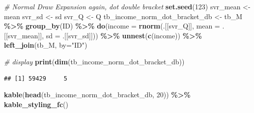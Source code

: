 \documentclass[
]{book}
\newenvironment{Shaded}{\begin{snugshade}}{\end{snugshade}}
\newcommand{\CommentTok}[1]{\textcolor[rgb]{0.56,0.35,0.01}{\textit{#1}}}
\newcommand{\DataTypeTok}[1]{\textcolor[rgb]{0.13,0.29,0.53}{#1}}
\newcommand{\DecValTok}[1]{\textcolor[rgb]{0.00,0.00,0.81}{#1}}
\newcommand{\KeywordTok}[1]{\textcolor[rgb]{0.13,0.29,0.53}{\textbf{#1}}}
\newcommand{\NormalTok}[1]{#1}
\newcommand{\OperatorTok}[1]{\textcolor[rgb]{0.81,0.36,0.00}{\textbf{#1}}}
\newcommand{\StringTok}[1]{\textcolor[rgb]{0.31,0.60,0.02}{#1}}
\begin{document}
\begin{Shaded}
\begin{Highlighting}[]
\CommentTok{\# Normal Draw Expansion again, dot double bracket}
\KeywordTok{set.seed}\NormalTok{(}\StringTok{\textquotesingle{}123\textquotesingle{}}\NormalTok{)}
\NormalTok{svr\_mean \textless{}{-}}\StringTok{ \textquotesingle{}mean\textquotesingle{}}
\NormalTok{svr\_sd \textless{}{-}}\StringTok{ \textquotesingle{}sd\textquotesingle{}}
\NormalTok{svr\_Q \textless{}{-}}\StringTok{ \textquotesingle{}Q\textquotesingle{}}
\NormalTok{tb\_income\_norm\_dot\_bracket\_db \textless{}{-}}\StringTok{ }\NormalTok{tb\_M }\OperatorTok{\%\textgreater{}\%}\StringTok{ }\KeywordTok{group\_by}\NormalTok{(ID) }\OperatorTok{\%\textgreater{}\%}
\StringTok{  }\KeywordTok{do}\NormalTok{(}\DataTypeTok{income =} \KeywordTok{rnorm}\NormalTok{(.[[svr\_Q]],}
                    \DataTypeTok{mean =}\NormalTok{ .[[svr\_mean]],}
                    \DataTypeTok{sd =}\NormalTok{ .[[svr\_sd]])) }\OperatorTok{\%\textgreater{}\%}
\StringTok{  }\KeywordTok{unnest}\NormalTok{(}\KeywordTok{c}\NormalTok{(income)) }\OperatorTok{\%\textgreater{}\%}
\StringTok{  }\KeywordTok{left\_join}\NormalTok{(tb\_M, }\DataTypeTok{by=}\StringTok{"ID"}\NormalTok{)}

\CommentTok{\# display}
\KeywordTok{print}\NormalTok{(}\KeywordTok{dim}\NormalTok{(tb\_income\_norm\_dot\_bracket\_db))}
\end{Highlighting}
\end{Shaded}

\begin{verbatim}
## [1] 59429     5
\end{verbatim}

\begin{Shaded}
\begin{Highlighting}[]
\KeywordTok{kable}\NormalTok{(}\KeywordTok{head}\NormalTok{(tb\_income\_norm\_dot\_bracket\_db, }\DecValTok{20}\NormalTok{)) }\OperatorTok{\%\textgreater{}\%}\StringTok{ }\KeywordTok{kable\_styling\_fc}\NormalTok{()}
\end{Highlighting}
\end{Shaded}
\end{document}

